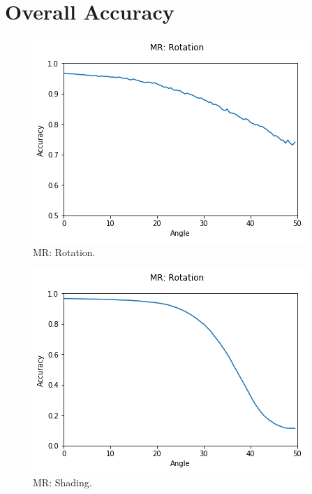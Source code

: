 \section{Overall Accuracy}
\begin{figure}
  \includegraphics[width=\linewidth]{images/rotation}
  \caption{MR: Rotation.}
  \label{fig:rotation 1}
\end{figure}

\begin{figure}
  \includegraphics[width=\linewidth]{images/shade}
  \caption{MR: Shading.}
  \label{fig: Shading}
\end{figure}

